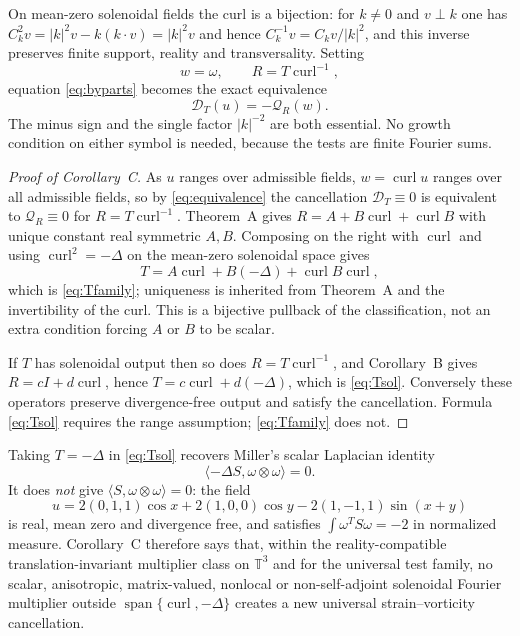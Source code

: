 \documentclass[11pt]{article}
\theoremstyle{definition}
\theoremstyle{remark}
\theoremstyle{plain}
\DeclareMathOperator{\curl}{curl}
\DeclareMathOperator{\spn}{span}
\newcommand{\T}{\mathbb{T}}
\newcommand{\Qform}{\mathcal{Q}}
\newcommand{\Dform}{\mathcal{D}}
\newcommand{\Ck}{C_k}
\begin{document}
On mean-zero solenoidal fields the curl is a bijection: for $k\ne0$ and
$v\perp k$ one has $\Ck^{2}v=|k|^{2}v-k(k\cdot v)=|k|^{2}v$ and hence
$\Ck^{-1}v=\Ck v/|k|^{2}$, and this inverse preserves finite support, reality
and transversality. Setting
\begin{equation}
\label{eq:substitution}
w=\omega,
\qquad
R=T\curl^{-1} ,
\end{equation}
equation \eqref{eq:byparts} becomes the exact equivalence
\begin{equation}
\label{eq:equivalence}
\Dform_{T}(u)=-\Qform_{R}(w) .
\end{equation}
The minus sign and the single factor $|k|^{-2}$ are both essential. No growth
condition on either symbol is needed, because the tests are finite Fourier
sums.

\begin{proof}[Proof of Corollary~C]
As $u$ ranges over admissible fields, $w=\curl u$ ranges over all admissible
fields, so by \eqref{eq:equivalence} the cancellation $\Dform_{T}\equiv0$ is
equivalent to $\Qform_{R}\equiv0$ for $R=T\curl^{-1}$. Theorem~A gives
$R=A+B\curl+\curl B$ with unique constant real symmetric $A,B$. Composing on
the right with $\curl$ and using $\curl^{2}=-\Delta$ on the mean-zero
solenoidal space gives
\[
T=A\curl+B(-\Delta)+\curl B\curl ,
\]
which is \eqref{eq:Tfamily}; uniqueness is inherited from Theorem~A and the
invertibility of the curl. This is a bijective pullback of the
classification, not an extra condition forcing $A$ or $B$ to be scalar.

If $T$ has solenoidal output then so does $R=T\curl^{-1}$, and Corollary~B
gives $R=cI+d\curl$, hence $T=c\curl+d(-\Delta)$, which is \eqref{eq:Tsol}.
Conversely these operators preserve divergence-free output and satisfy the
cancellation. Formula \eqref{eq:Tsol} requires the range assumption;
\eqref{eq:Tfamily} does not.
\end{proof}

Taking $T=-\Delta$ in \eqref{eq:Tsol} recovers Miller's scalar Laplacian
identity~\cite{Miller2026}
\begin{equation}
\label{eq:miller}
\langle-\Delta S,\omega\otimes\omega\rangle=0 .
\end{equation}
It does \emph{not} give $\langle S,\omega\otimes\omega\rangle=0$: the field
\[
u=2(0,1,1)\cos x+2(1,0,0)\cos y-2(1,-1,1)\sin(x+y)
\]
is real, mean zero and divergence free, and satisfies
$\int\omega^{T}S\omega=-2$ in normalized measure. Corollary~C therefore says
that, within the reality-compatible translation-invariant multiplier class on
$\T^{3}$ and for the universal test family, no scalar, anisotropic,
matrix-valued, nonlocal or non-self-adjoint solenoidal Fourier multiplier
outside $\spn\{\curl,-\Delta\}$ creates a new universal strain--vorticity
cancellation.
\end{document}
